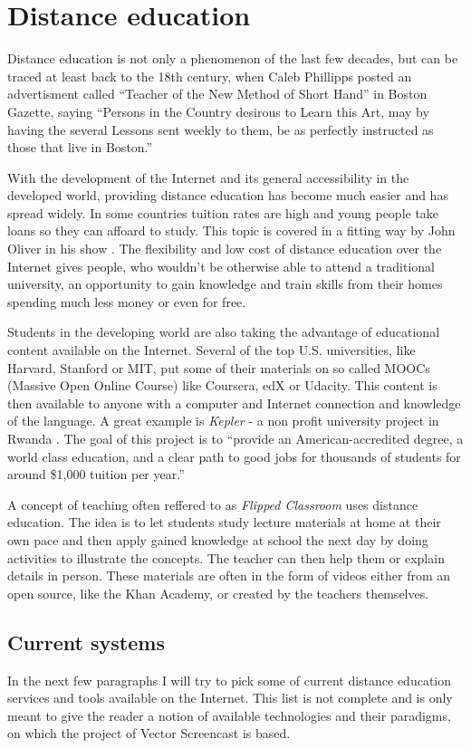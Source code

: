 \chapter{Distance education}

Distance education is not only a phenomenon of the last few decades, but can be traced at least back to the 18th century, when Caleb Phillipps posted an advertisment called ``Teacher of the New Method of Short Hand'' in Boston Gazette, saying ``Persons in the Country desirous to Learn this Art, may by having the several Lessons sent weekly to them, be as perfectly instructed as those that live in Boston.'' \cite{1}

With the development of the Internet and its general accessibility in the developed world, providing distance education has become much easier and has spread widely. In some countries tuition rates are high and young people take loans so they can affoard to study. This topic is covered in a fitting way by John Oliver in his show \cite{2}. The flexibility and low cost of distance education over the Internet gives people, who wouldn't be otherwise able to attend a traditional university, an opportunity to gain knowledge and train skills from their homes \cite{3} spending much less money or even for free.

Students in the developing world are also taking the advantage of educational content available on the Internet. Several of the top U.S. universities, like Harvard, Stanford or MIT, put some of their materials on so called MOOCs (Massive Open Online Course) like Coursera, edX or Udacity. This content is then available to anyone with a computer and Internet connection and knowledge of the language. A great example is \textit{Kepler} - a non profit university project in Rwanda \cite{5}. The goal of this project is to ``provide an American-accredited degree, a world class education, and a clear path to good jobs for thousands of students for around \$1,000 tuition per year.'' \cite{6}

A concept of teaching often reffered to as \textit{Flipped Classroom} uses distance education. The idea is to let students study lecture materials at home at their own pace and then apply gained knowledge at school the next day by doing activities to illustrate the concepts. The teacher can then help them or explain details in person. These materials are often in the form of videos either from an open source, like the Khan Academy, or created by the teachers themselves.

\section{Current systems}
In the next few paragraphs I will try to pick some of current distance education services and tools available on the Internet. This list is not complete and is only meant to give the reader a notion of available technologies and their paradigms, on which the project of Vector Screencast is based.

